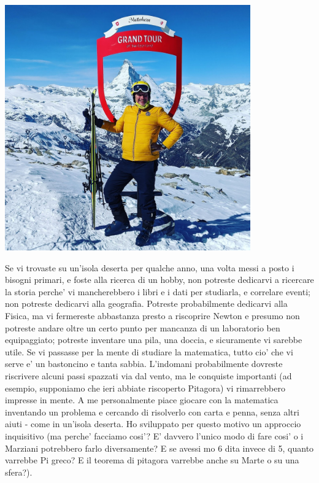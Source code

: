 \label{introduzione}


\includegraphics[height = 300pt, width = 300pt]{images/RiccardoMatterhorn.jpeg}

Se vi trovaste su un'isola deserta per qualche anno, una volta messi a posto i bisogni primari, e foste alla ricerca di un hobby, non potreste dedicarvi a ricercare la storia
perche' vi mancherebbero i libri e i dati per studiarla, e correlare eventi; non potreste dedicarvi alla geografia. Potreste probabilmente dedicarvi alla Fisica, ma vi fermereste
abbastanza presto a riscoprire Newton e presumo non potreste andare oltre un certo punto per mancanza di un laboratorio ben equipaggiato; potreste inventare una pila, una doccia,
e sicuramente vi sarebbe utile. Se vi passasse per la mente di studiare la matematica, tutto cio' che vi serve e' un bastoncino e tanta sabbia. L'indomani probabilmente dovreste
riscrivere alcuni passi spazzati via dal vento, ma le conquiste importanti (ad esempio, supponiamo che ieri abbiate riscoperto Pitagora) vi rimarrebbero impresse in mente.
A me personalmente piace giocare con la matematica inventando un problema e cercando di risolverlo con carta e penna, senza altri aiuti - come in un'isola deserta. Ho sviluppato 
per questo motivo un approccio inquisitivo (ma perche' facciamo cosi'? E' davvero l'unico modo di fare cosi' o i Marziani potrebbero farlo diversamente? E se avessi mo 6 dita
invece di 5, quanto varrebbe Pi greco? E il teorema di pitagora varrebbe anche su Marte o su una sfera?).

